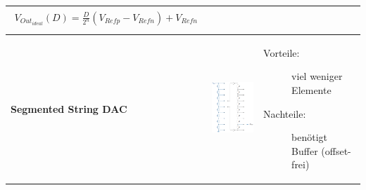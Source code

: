 \begin{tabular}{|>{\bfseries}p{3cm}|c|p{6.6cm}|}
	  {\begin{align*}
	  	V_{Out_{ideal}}(D) = \frac{D}{2^n}(V_{Refp}-V_{Refn})+V_{Refn}\\
	  \end{align*}}
	  
	\\ \hline
	Segmented String DAC \hartl{459}
	& \includegraphics[width=5cm, valign=t]{pictures/segmented_string_DAC}
	& \begin{description}
  		\item[Vorteile: ] viel weniger Elemente
  		\item[Nachteile:] benötigt Buffer (offset-frei)
	  \end{description}
	\\ \hline
\end{tabular}
\renewcommand{\arraystretch}{\arraystretchOriginal}


